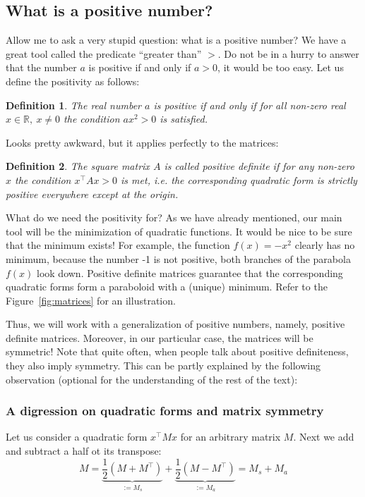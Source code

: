 \documentclass[notitlepage]{report}
\newtheorem{definition}{Definition}
\begin{document}
\subsection{What is a positive number?}
Allow me to ask a very stupid question: what is a positive number?
We have a great tool called the predicate ``greater than'' $>$.
Do not be in a hurry to answer that the number $a$ is positive if and only if $a>0$, it would be too easy. Let us define the positivity as follows:

\begin{definition}
The real number $a$ is positive if and only if for all non-zero real $x\in\mathbb R,\ x\neq 0$ the condition $ax^2>0$ is satisfied.
\end{definition}

Looks pretty awkward, but it applies perfectly to the matrices:

\begin{definition}
The square matrix $A$ is called positive definite if for any non-zero $x$
the condition $x^\top A x > 0$ is met, i.e. the corresponding quadratic form is strictly positive everywhere except at the origin.
\end{definition}

What do we need the positivity for?
As we have already mentioned, our main tool will be the minimization of quadratic functions. 
It would be nice to be sure that the minimum exists!
For example, the function $f(x) = - x^2$ clearly has no minimum, because the number -1 is not positive, 
both branches of the parabola $f(x)$ look down.
Positive definite matrices guarantee that the corresponding quadratic forms form a paraboloid with a (unique) minimum.
Refer to the Figure~\ref{fig:matrices} for an illustration.

Thus, we will work with a generalization of positive numbers, namely, positive definite matrices. 
Moreover, in our particular case, the matrices will be symmetric!
Note that quite often, when people talk about positive definiteness, they also imply symmetry.
This can be partly explained by the following observation (optional for the understanding of the rest of the text):

\subsubsection{A digression on quadratic forms and matrix symmetry}

Let us consider a quadratic form $x^\top M x$ for an arbitrary matrix $M$. 
Next we add and subtract a half ot its transpose:
$$
M = \underbrace{\frac{1}{2} (M+M^\top)}_{:=M_s} + \underbrace{\frac{1}{2} (M-M^\top)}_{:=M_a} = M_s + M_a
$$
\end{document}
